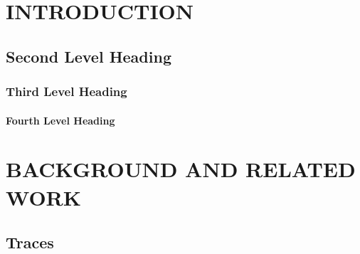 \documentclass[twoside]{article}
\begin{document}
\section{INTRODUCTION}


\subsection{Second Level Heading}

\subsubsection{Third Level Heading}

\paragraph{Fourth Level Heading}

\section{BACKGROUND AND RELATED WORK}

\subsection{Traces}
\end{document}
